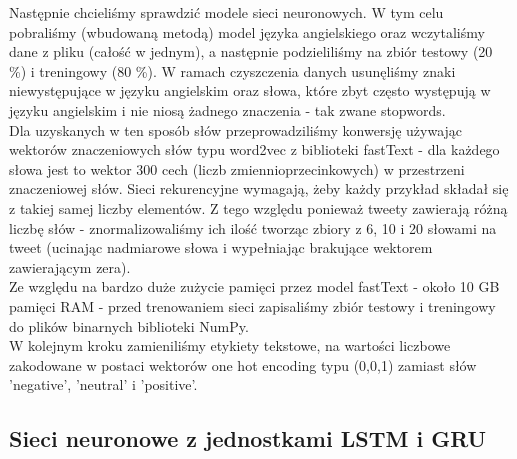 \documentclass[11pt, a4paper, notitlepage]{report}
\begin{document}
Następnie chcieliśmy sprawdzić modele sieci neuronowych. W tym celu pobraliśmy (wbudowaną metodą) model języka angielskiego oraz wczytaliśmy dane z pliku (całość w jednym), a następnie podzieliliśmy na zbiór testowy (20 \%) i treningowy (80 \%).
W ramach czyszczenia danych usunęliśmy znaki niewystępujące w języku angielskim oraz słowa, które zbyt często występują w języku angielskim i nie niosą żadnego znaczenia - tak zwane stopwords.
\\
Dla uzyskanych w ten sposób słów przeprowadziliśmy konwersję używając wektorów znaczeniowych słów typu word2vec z biblioteki fastText - dla każdego słowa jest to wektor 300 cech (liczb zmiennioprzecinkowych) w przestrzeni znaczeniowej słów. Sieci rekurencyjne wymagają, żeby każdy przykład składał się z takiej samej liczby elementów. Z tego względu ponieważ tweety zawierają różną liczbę słów - znormalizowaliśmy ich ilość tworząc zbiory z 6, 10 i 20 słowami na tweet (ucinając nadmiarowe słowa i wypełniając brakujące wektorem zawierającym zera).
\\
Ze względu na bardzo duże zużycie pamięci przez model fastText - około 10 GB pamięci RAM - przed trenowaniem sieci zapisaliśmy zbiór testowy i treningowy do plików binarnych biblioteki NumPy.
\\
W kolejnym kroku zamieniliśmy etykiety tekstowe, na wartości liczbowe zakodowane w postaci wektorów one hot encoding typu (0,0,1) zamiast słów 'negative', 'neutral' i 'positive'.

\subsection{Sieci neuronowe z jednostkami LSTM i GRU}
\end{document}
